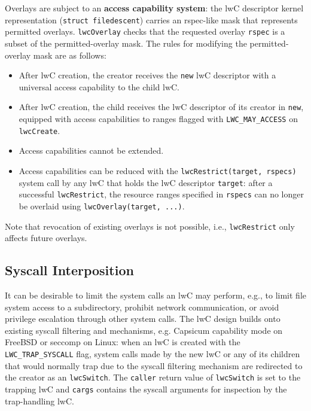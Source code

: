 \documentclass[10pt,twocolumn,a4paper]{article}
\begin{document}
Overlays are subject to an \textbf{access capability system}:
the lwC descriptor kernel representation (\lstinline{struct filedescent}) carries an rspec-like mask that represents permitted overlays.
\lstinline{lwcOverlay} checks that the requested overlay \lstinline{rspec} is a subset of the permitted-overlay mask.
The rules for modifying the permitted-overlay mask are as follows:
\begin{itemize}[nosep] %
  \item After lwC creation, the creator receives the \lstinline{new} lwC descriptor with a universal access capability to the child lwC.
  \item After lwC creation, the child receives the lwC descriptor of its creator in \lstinline{new}, equipped with access capabilities to ranges flagged with \lstinline{LWC_MAY_ACCESS} on \lstinline{lwcCreate}.
  \item Access capabilities cannot be extended.
  \item Access capabilities can be reduced with the \lstinline{lwcRestrict(target, rspecs)} system call by any lwC that holds the lwC descriptor \lstinline{target}:
        after a successful \lstinline{lwcRestrict}, the resource ranges specified in \lstinline{rspecs} can no longer be overlaid using \lstinline{lwcOverlay(target, ...)}.
\end{itemize}
Note that revocation of existing overlays is not possible, i.e., \lstinline{lwcRestrict} only affects future overlays.
\cite{lwckernelrepo,lwcpaper}

\subsection{Syscall Interposition}\label{design:syscallinterpos}
It can be desirable to limit the system calls an lwC may perform, e.g., to limit file system access to a subdirectory, prohibit network communication, or avoid privilege escalation through other system calls.  
The lwC design builds onto existing syscall filtering and mechanisms, e.g. Capsicum capability mode on FreeBSD or seccomp on Linux:
when an lwC is created with the \lstinline{LWC_TRAP_SYSCALL} flag, system calls made by the new lwC or any of its children that would normally trap due to the syscall filtering mechanism are redirected to the creator as an \lstinline{lwcSwitch}.
The \lstinline{caller} return value of \lstinline{lwcSwitch} is set to the trapping lwC and \lstinline{cargs} contains the syscall arguments for inspection by the trap-handling lwC.
\cite{lwcpaper}
\end{document}
